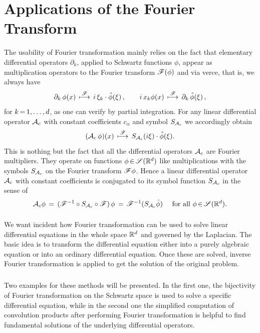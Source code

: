 \documentclass[11pt,twoside]{article}
\begin{document}
\section{Applications of the Fourier Transform}                                %
The usability of Fourier transformation mainly relies on the fact
that elementary differential operators $\partial_k$,
applied to Schwartz functions $\phi$,
appear as multiplication operators to the Fourier transform $\mathscr{F}(\phi)$
and via verce,
that is, 
we always have
\[
\partial_k \, \phi(x) \, \overset{\mathscr{F}}{\longmapsto}
\, i \, \xi_k \cdot \hat{\phi}(\xi)\,,
\quad \quad
i \, x_k \phi(x) \, \overset{\mathscr{F}}{\longmapsto}
\, \partial_k \, \hat{\phi}(\xi)\,,
\]
for $k {\,=\,} 1,\ldots,d$,
as one can verify by partial integration.
For any linear differential operator ${\mathcal{A}}_c$
with constant coefficients $c_{\alpha}$
and symbol $S_{{\mathcal{A}}_c}$ we accordingly obtain 
\[
({\mathcal{A}}_c \, \phi)(x) \, \overset{\mathscr{F}}{\longmapsto} \,
S_{{\mathcal{A}}_c}(i \xi) \cdot \hat{\phi}(\xi).
\]
This is nothing but the fact
that all the differential operators ${\mathcal{A}}_c$ are Fourier multipliers.
They operate on functions $\phi {\,\in\,} \mathscr{S}({\mathbb{R}}^d)$ like multi\-plications
with the symbols $S_{{\mathcal{A}}_c}$ on the Fourier trans\-form $\mathscr{F} \phi$.
Hence a linear differential operator ${\mathcal{A}}_c$ with constant coefficients
is conjugated to its symbol function $S_{{\mathcal{A}}_c}$ in the sense of
\[
{\mathcal{A}}_c \phi \,=\,
(\mathscr{F}^{-1} \circ S_{{\mathcal{A}}_c} \circ \mathscr{F}) \, \phi \,=\,
\mathscr{F}^{-1}(S_{{\mathcal{A}}_c} \hat{\phi})
\quad \mbox{ for all } \phi {\,\in\,} \mathscr{S}({\mathbb{R}}^d).
\]

\paragraph{} %
We want incident
how Fourier transformation can be used
to solve linear differential equations in the whole space ${\mathbb{R}}^d$
and governed by the Laplacian.
The basic idea is to transform the differential equation
either into a purely algebraic equation
or into an ordinary differential equation.
Once these are solved,
inverse Fourier transformation is applied
to get the solution of the original problem.

\subparagraph{}
Two examples for these methods will be presented.
In the first one,
the bijectivity of Fourier transformation on the Schwartz space
is used to solve a specific differential equation,
while in the second one the simplified computation of convolution
products after performing Fourier transformation is helpful
to find fundamental solutions of the underlying differential operators.
\end{document}

